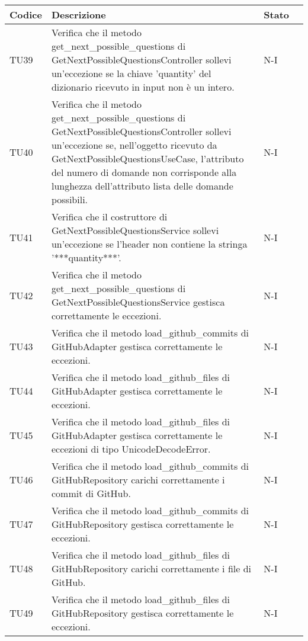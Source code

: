 \begin{table}[h!]
    \centering
    \renewcommand{\arraystretch}{1.5}
    \begin{tabularx}{\textwidth}{|p{}|X|p{}|p{}|}\hline
    \rowcolor[HTML]{FFD700}
    \textbf{Codice} & \textbf{Descrizione} & \textbf{Stato} \\ \hline
    TU39 & Verifica che il metodo get\_next\_possible\_questions di GetNextPossibleQuestionsController sollevi un'eccezione se la chiave 'quantity' del dizionario ricevuto in input non è un intero. &  N-I \\ \hline
    TU40 & Verifica che il metodo get\_next\_possible\_questions di GetNextPossibleQuestionsController sollevi un'eccezione se, nell'oggetto ricevuto da GetNextPossibleQuestionsUseCase, l'attributo del numero di domande non corrisponde alla lunghezza dell'attributo lista delle domande possibili. &  N-I \\ \hline
    TU41 & Verifica che il costruttore di GetNextPossibleQuestionsService sollevi un'eccezione se l'header non contiene la stringa '***quantity***'. &  N-I \\ \hline
    TU42 & Verifica che il metodo get\_next\_possible\_questions di GetNextPossibleQuestionsService gestisca correttamente le eccezioni. &  N-I \\ \hline
    TU43 & Verifica che il metodo load\_github\_commits di GitHubAdapter gestisca correttamente le eccezioni. &  N-I \\ \hline
    TU44 & Verifica che il metodo load\_github\_files di GitHubAdapter gestisca correttamente le eccezioni. &  N-I \\ \hline
    TU45 & Verifica che il metodo load\_github\_files di GitHubAdapter gestisca correttamente le eccezioni di tipo UnicodeDecodeError. &  N-I \\ \hline
    TU46 & Verifica che il metodo load\_github\_commits di GitHubRepository carichi correttamente i commit di GitHub. &  N-I \\ \hline
    TU47 & Verifica che il metodo load\_github\_commits di GitHubRepository gestisca correttamente le eccezioni. &  N-I \\ \hline
    TU48 & Verifica che il metodo load\_github\_files di GitHubRepository carichi correttamente i file di GitHub. &  N-I \\ \hline
    TU49 & Verifica che il metodo load\_github\_files di GitHubRepository gestisca correttamente le eccezioni. &  N-I \\ \hline

\end{tabularx}
\end{table}
